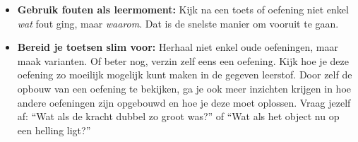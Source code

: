 \documentclass{ximera}
\begin{document}
\begin{itemize}
Deze sessies zijn een aanvulling op je gewone studiemomenten, geen vervanging ervan.
Als je dit een tijd volhoudt, zal je merken dat je de technieken beter beheerst en sneller toepast.
\begin{remark}
Deze methode is gebaseerd op de \textit{repetition method}, waarbij je iets dat je wilt leren herhaalt vlak na het leren, vervolgens één dag later, één week later en één maand later.
Op die manier bereik je met minder totale studietijd een groter en langduriger leerresultaat.
Het nadeel is wel dat deze aanpak wat planning en discipline vraagt.
 \end{remark}


  \item \textbf{Gebruik fouten als leermoment:}  
  Kijk na een toets of oefening niet enkel \textit{wat} fout ging, maar \textit{waarom}.  
  Dat is de snelste manier om vooruit te gaan.

  \item \textbf{Bereid je toetsen slim voor:}  
  Herhaal niet enkel oude oefeningen, maar maak varianten. Of beter nog, verzin zelf eens een oefening. Kijk hoe je deze oefening zo moeilijk mogelijk kunt maken in de gegeven leerstof. Door zelf de opbouw van een oefening te bekijken, ga je ook meer inzichten krijgen in hoe andere oefeningen zijn opgebouwd en hoe je deze moet oplossen.
  Vraag jezelf af: “Wat als de kracht dubbel zo groot was?” of “Wat als het object nu op een helling ligt?”
\end{itemize}




\end{document}
